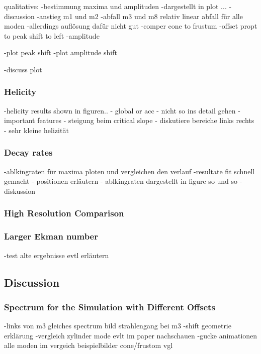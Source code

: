 qualitative:
-bestimmung maxima und amplituden
-dargestellt in plot ...
- discussion
-anstieg m1 und m2
-abfall m3 und m8
relativ linear abfall für alle moden
-allerdings auflösung dafür nicht gut
-comper cone to frustum
-offset propt to peak shift to left
-amplitude

-plot peak shift
-plot amplitude shift

-discuss plot



\subsubsection{Helicity}

-helicity results shown in figuren..
- global or acc
- nicht so ins detail gehen
- important features
- steigung beim critical slope
- diskutiere bereiche links rechts
- sehr kleine helizität

\subsubsection{Decay rates}

-ablkingraten für maxima ploten und vergleichen den verlauf
-resultate fit schnell gemacht
- positionen erläutern
- ablkingraten dargestellt in figure so und so
- diskussion

\subsubsection{High Resolution Comparison}

\subsubsection{Larger Ekman number}

-test alte ergebnisse evtl erläutern

\clearpage

\subsection{Discussion}

\subsubsection{Spectrum for the Simulation with Different Offsets}

-links von m3 gleiches spectrum bild strahlengang bei m3
-shift geometrie erklärung
-vergleich zylinder mode evlt im paper nachschauen
-gucke animationen alle moden im vergeich beispielbilder  cone/frustom vgl

